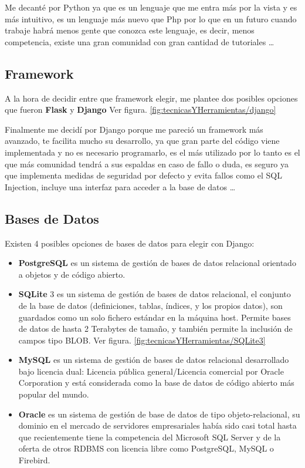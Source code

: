 Me decanté por Python ya que es un lenguaje que me entra más por la vista y es más intuitivo, es un lenguaje más nuevo que Php por lo que en un futuro cuando trabaje habrá menos gente que conozca este lenguaje, es decir, menos competencia, existe una gran comunidad con gran cantidad de tutoriales \ldots


\subsection{Framework}

A la hora de decidir entre que framework elegir, me plantee dos posibles opciones que fueron \textbf{Flask} \cite{Flask} y \textbf{Django} \cite{Django} Ver figura. \ref{fig:tecnicasYHerramientas/django}

Finalmente me decidí por Django porque me pareció un framework más avanzado, te facilita mucho su desarrollo, ya que gran parte del código viene implementada y no es necesario programarlo, es el más utilizado por lo tanto es el que más comunidad tendrá a sus espaldas en caso de fallo o duda, es seguro ya que implementa medidas de seguridad por defecto y evita fallos como el SQL Injection, incluye una interfaz para acceder a la base de datos \ldots

\subsection{Bases de Datos}

Existen 4 posibles opciones de bases de datos para elegir con Django:
	\begin{itemize}
	\item \textbf{PostgreSQL} \cite{PostgreSQL} es un sistema de gestión de bases de datos relacional orientado a objetos y de código abierto. 
	\item \textbf{SQLite} 3 \cite{SQLite3} es un sistema de gestión de bases de datos relacional, el conjunto de la base de datos (definiciones, tablas, índices, y los propios datos), son guardados como un solo fichero estándar en la máquina host. Permite bases de datos de hasta 2 Terabytes de tamaño, y también permite la inclusión de campos tipo BLOB. Ver figura. \ref{fig:tecnicasYHerramientas/SQLite3}
	\item \textbf{MySQL} \cite{MySQL} es un sistema de gestión de bases de datos relacional desarrollado bajo licencia dual: Licencia pública general/Licencia comercial por Oracle Corporation y está considerada como la base de datos de código abierto más popular del mundo.
	\item \textbf{Oracle} \cite{Oracle} es un sistema de gestión de base de datos de tipo objeto-relacional, su dominio en el mercado de servidores empresariales había sido casi total hasta que recientemente tiene la competencia del Microsoft SQL Server y de la oferta de otros RDBMS con licencia libre como PostgreSQL, MySQL o Firebird.
	\end{itemize}

